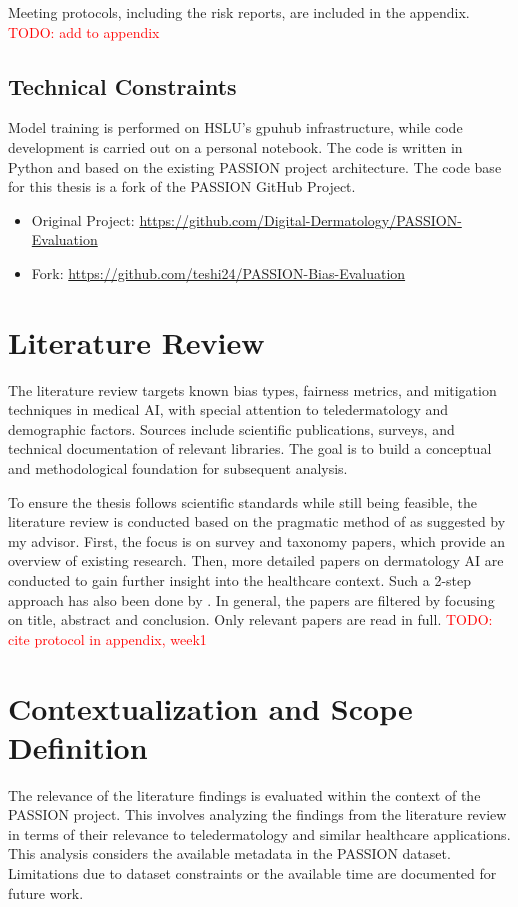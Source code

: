\documentclass[12pt, a4paper, oneside]{book}   	%
\renewcommand{\todo}[1]{\textcolor{red}{TODO: #1}}
\begin{document}
		Meeting protocols, including the risk reports, are included in the appendix. \todo{add to appendix}
		
		\subsection{Technical Constraints}
		Model training is performed on \gls{HSLU}'s \gls{gpuhub} infrastructure, while code development is carried out on a personal notebook. The code is written in Python and based on the existing PASSION project architecture.
		The code base for this thesis is a fork of the PASSION GitHub Project.
		\begin{itemize}
			\item Original Project: \href{https://github.com/Digital-Dermatology/PASSION-Evaluation}{https://github.com/Digital-Dermatology/PASSION-Evaluation}
			\item Fork: \href{https://github.com/teshi24/PASSION-Bias-Evaluation}{https://github.com/teshi24/PASSION-Bias-Evaluation}
		\end{itemize}
		
		
		\section{Literature Review}
		The literature review targets known bias types, fairness metrics, and mitigation techniques in medical \gls{AI}, with special attention to \gls{teledermatology} and demographic factors. Sources include scientific publications, surveys, and technical documentation of relevant libraries. The goal is to build a conceptual and methodological foundation for subsequent analysis.
		
		To ensure the thesis follows scientific standards while still being feasible, the literature review is conducted based on the pragmatic method of \textcite{Alake_2021} as suggested by my advisor. First, the focus is on survey and taxonomy papers, which provide an overview of existing research. Then, more detailed papers on dermatology \gls{AI} are conducted to gain further insight into the healthcare context. Such a 2-step approach has also been done by \textcite{Chen_2024}. In general, the papers are filtered by focusing on title, abstract and conclusion. Only relevant papers are read in full. \todo{cite protocol in appendix, week1}
		
		\section{Contextualization and Scope Definition} \label{chap:contextMethod}
		The relevance of the literature findings is evaluated within the context of the PASSION project. This involves analyzing the findings from the literature review in terms of their relevance to \gls{teledermatology} and similar healthcare applications. This analysis considers the available metadata in the PASSION dataset. Limitations due to dataset constraints or the available time are documented for future work.
		
\end{document}
